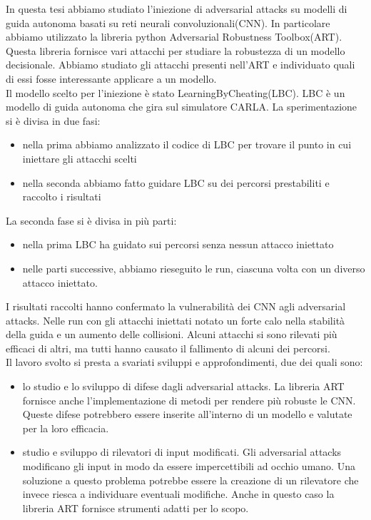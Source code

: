 In questa tesi abbiamo studiato l'iniezione di adversarial attacks su modelli di guida autonoma basati su reti neurali convoluzionali(CNN). In particolare
abbiamo utilizzato la libreria python Adversarial Robustness Toolbox(ART). Questa libreria fornisce vari attacchi per studiare la robustezza di un
modello decisionale. Abbiamo studiato gli attacchi presenti nell'ART  e individuato quali di essi fosse interessante applicare a un modello.\\

Il  modello  scelto per l'iniezione è stato LearningByCheating(LBC). LBC è un modello di guida autonoma che gira sul simulatore 
CARLA. La sperimentazione si è divisa in due fasi:\begin{itemize}
    \item nella prima abbiamo analizzato il codice di LBC per trovare il punto  in cui iniettare gli attacchi scelti
    \item nella seconda abbiamo fatto guidare LBC su dei percorsi prestabiliti e raccolto i risultati
\end{itemize} 

La seconda fase si è divisa in più parti:\begin{itemize}
    \item nella prima LBC ha guidato sui percorsi senza nessun attacco iniettato
    \item nelle parti successive, abbiamo rieseguito le run, ciascuna volta con un diverso attacco iniettato.
\end{itemize}

I risultati raccolti hanno confermato la vulnerabilità dei CNN agli adversarial attacks. Nelle run con gli attacchi iniettati notato un forte calo nella stabilità della guida e un aumento delle collisioni.
Alcuni attacchi si sono rilevati più efficaci di altri, ma tutti hanno causato il fallimento di alcuni dei percorsi.\\

Il lavoro svolto si presta a svariati sviluppi e approfondimenti, due  dei quali sono:\begin{itemize}
    \item lo studio e lo sviluppo di difese dagli adversarial attacks. La libreria ART fornisce anche l'implementazione di metodi per rendere più robuste le CNN.
    Queste difese potrebbero essere inserite all'interno di un modello e valutate per la loro efficacia.
    \item studio e sviluppo di rilevatori di input modificati. Gli adversarial attacks modificano gli input in modo da essere impercettibili ad occhio umano. Una 
    soluzione a questo problema potrebbe essere la creazione di un rilevatore che invece riesca a individuare eventuali modifiche. Anche in questo caso
    la libreria ART  fornisce strumenti adatti per lo scopo.
\end{itemize}